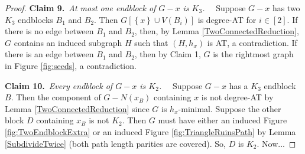 \documentclass[12pt]{article}
\theoremstyle{plain}
\theoremstyle{definition}
\theoremstyle{remark}
\newcommand{\set}[1]{\left\{ #1 \right\}}
\newcommand{\irange}[1]{\left[#1\right]}
\newcommand{\claim}[2]{{\bf Claim #1.}~{\it #2}~~}
\begin{document}
\begin{proof}
	 \claim{9}{At most one endblock of $G-x$ is $K_3$.}
	 Suppose $G-x$ has two $K_3$ endblocks $B_1$ and $B_2$.  Then $G[\set{x} \cup V(B_i)]$ is degree-AT for $i \in \irange{2}$.  If there is no edge between $B_1$ and $B_2$, then, by Lemma \ref{TwoConnectedReduction}, $G$ contains an induced subgraph $H$ such that $(H,h_x)$ is AT, a contradiction.  If there is an edge between $B_1$ and $B_2$, then by Claim 1, $G$ is the rightmost graph in Figure \ref{fig:seeds}, a contradiction.
	 
	 \claim{10}{Every endblock of $G-x$ is $K_2$.}
	 Suppose $G-x$ has a $K_3$ endblock $B$.  Then the component of $G-N(x_B)$ containing $x$ is not degree-AT by Lemma \ref{TwoConnectedReduction} since $G$ is $h_x$-minimal.  Suppose the other block $D$ containing $x_B$ is not $K_2$. Then $G$ must have either an induced Figure \ref{fig:TwoEndblockExtra} or an induced Figure \ref{fig:TriangleRuinsPath} by Lemma \ref{SubdivideTwice} (both path length parities are covered).  So, $D$ is $K_2$.  Now...

\end{proof}



\end{document}

